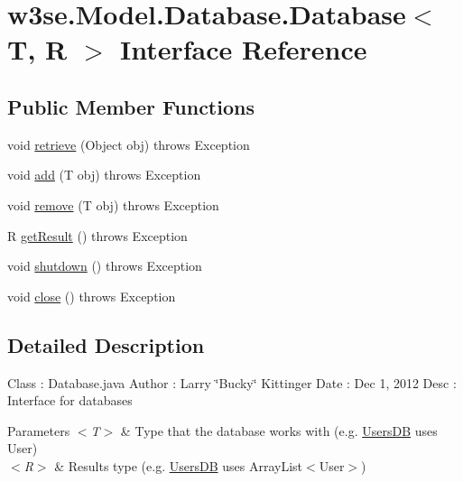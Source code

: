 \hypertarget{interfacew3se_1_1_model_1_1_database_1_1_database_3_01_t_00_01_r_01_4}{\section{w3se.\-Model.\-Database.\-Database$<$ T, R $>$ Interface Reference}
\label{interfacew3se_1_1_model_1_1_database_1_1_database_3_01_t_00_01_r_01_4}
}
\subsection*{Public Member Functions}
\begin{DoxyCompactItemize}
\item 
void \hyperlink{interfacew3se_1_1_model_1_1_database_1_1_database_3_01_t_00_01_r_01_4_a77a343a6767d8dfb5222d143bd767b33}{retrieve} (Object obj)  throws Exception
\item 
void \hyperlink{interfacew3se_1_1_model_1_1_database_1_1_database_3_01_t_00_01_r_01_4_a2b98a86661205c536feb28fb94754c67}{add} (T obj)  throws Exception
\item 
void \hyperlink{interfacew3se_1_1_model_1_1_database_1_1_database_3_01_t_00_01_r_01_4_a622ab9cb4ac075d7a4972c3717e6de6d}{remove} (T obj)  throws Exception
\item 
R \hyperlink{interfacew3se_1_1_model_1_1_database_1_1_database_3_01_t_00_01_r_01_4_ade5f341c75cecc5bccbbb48edb86bce8}{get\-Result} ()  throws Exception
\item 
void \hyperlink{interfacew3se_1_1_model_1_1_database_1_1_database_3_01_t_00_01_r_01_4_a331e46999bbff8469043cebb389ca8b6}{shutdown} ()  throws Exception
\item 
void \hyperlink{interfacew3se_1_1_model_1_1_database_1_1_database_3_01_t_00_01_r_01_4_ae86be43d93f477aa56f92d55446a85a8}{close} ()  throws Exception
\end{DoxyCompactItemize}


\subsection{Detailed Description}
Class \-: Database.\-java Author \-: Larry \char`\"{}\-Bucky\char`\"{} Kittinger Date \-: Dec 1, 2012 Desc \-: Interface for databases 
\begin{DoxyParams}{Parameters}
{\em $<$\-T$>$} & Type that the database works with (e.\-g. \hyperlink{classw3se_1_1_model_1_1_database_1_1_users_d_b}{Users\-D\-B} uses User) \\
\hline
{\em $<$\-R$>$} & Results type (e.\-g. \hyperlink{classw3se_1_1_model_1_1_database_1_1_users_d_b}{Users\-D\-B} uses Array\-List$<$\-User$>$) \\
\hline
\end{DoxyParams}


